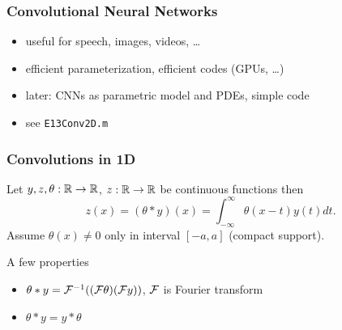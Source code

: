 \documentclass[12pt,fleqn,handout]{beamer}
\begin{document}
\begin{frame}\frametitle{Convolutional Neural Networks~\cite{LeCun1990}}
	\begin{center}
	\end{center}
	\begin{itemize}
		\item useful for speech, images, videos, \ldots
		\item efficient parameterization, efficient codes (GPUs, \ldots)
		\item later: CNNs as parametric model and PDEs, simple code
		\item see \texttt{E13Conv2D.m}
	\end{itemize}

\end{frame}

\begin{frame}\frametitle{Convolutions in 1D}
	Let $y, z, \theta:\mathbb{R} \to \mathbb{R}$, $z : \mathbb{R}\to\mathbb{R}$ be continuous functions then
	\begin{equation*}
		z(x) = (\theta * y)(x) = \int_{-\infty}^\infty \theta(x-t) y(t) dt.
	\end{equation*}
	Assume $\theta(x) \neq 0$ only in interval $[-a,a]$ (compact support).
	
	\bigskip
	\pause
	
	A few properties
	\begin{itemize}
	\item $ \theta * y = {\cal F}^{-1}(({\cal F} \theta) ({\cal F} y))$, ${\cal F}$ is Fourier transform
	\item $ \theta * y =  y * \theta$ 
	\end{itemize}
	
	
\end{frame}	
\end{document}
